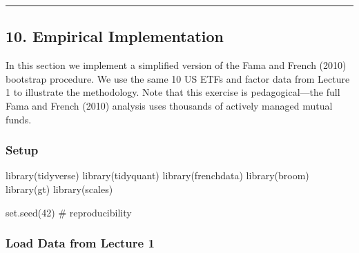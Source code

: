 \documentclass[
  letterpaper,
  DIV=11,
  numbers=noendperiod]{scrartcl}
\newenvironment{Shaded}{\begin{snugshade}}{\end{snugshade}}
\newcommand{\CommentTok}[1]{\textcolor[rgb]{0.37,0.37,0.37}{#1}}
\newcommand{\DecValTok}[1]{\textcolor[rgb]{0.68,0.00,0.00}{#1}}
\newcommand{\FunctionTok}[1]{\textcolor[rgb]{0.28,0.35,0.67}{#1}}
\newcommand{\NormalTok}[1]{\textcolor[rgb]{0.00,0.23,0.31}{#1}}
\begin{document}
\begin{center}\rule{0.5\linewidth}{0.5pt}\end{center}

\subsection{10. Empirical
Implementation}\label{empirical-implementation}

In this section we implement a simplified version of the Fama and French
(2010) bootstrap procedure. We use the same 10 US ETFs and factor data
from Lecture 1 to illustrate the methodology. Note that this exercise is
pedagogical---the full Fama and French (2010) analysis uses thousands of
actively managed mutual funds.

\subsubsection{Setup}\label{setup}

\begin{Shaded}
\begin{Highlighting}[]
\FunctionTok{library}\NormalTok{(tidyverse)}
\FunctionTok{library}\NormalTok{(tidyquant)}
\FunctionTok{library}\NormalTok{(frenchdata)}
\FunctionTok{library}\NormalTok{(broom)}
\FunctionTok{library}\NormalTok{(gt)}
\FunctionTok{library}\NormalTok{(scales)}

\FunctionTok{set.seed}\NormalTok{(}\DecValTok{42}\NormalTok{)  }\CommentTok{\# reproducibility}
\end{Highlighting}
\end{Shaded}

\subsubsection{Load Data from Lecture 1}\label{load-data-from-lecture-1}
\end{document}
